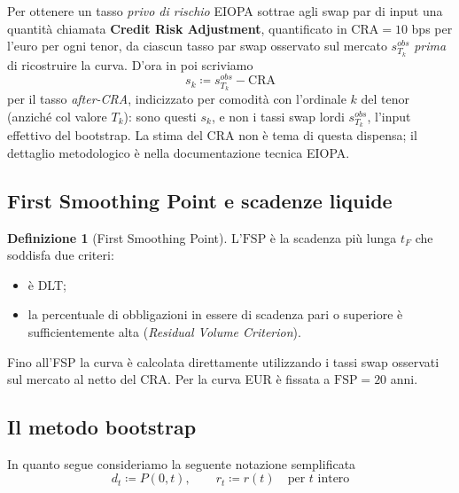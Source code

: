 \documentclass[11pt,a4paper]{article}
\theoremstyle{plain}
\theoremstyle{definition}
\newtheorem{definizione}[teorema]{Definizione}
\theoremstyle{remark}
\newcommand{\FSP}{\mathrm{FSP}}
\newcommand{\CRA}{\mathrm{CRA}}
\newcommand{\defeq}{\coloneqq}
\begin{document}
Per ottenere un tasso \emph{privo di rischio} EIOPA sottrae agli swap par di input una quantità chiamata \textbf{Credit Risk
Adjustment}, quantificato in $\CRA = 10$ bps per l'euro per ogni tenor, da ciascun tasso par swap osservato sul mercato $s^{obs}_{T_k}$
\emph{prima} di ricostruire la curva.
D'ora in poi scriviamo
\begin{equation}
  \label{eq:cra-def}
  s_k \defeq s^{obs}_{T_k} - \CRA
\end{equation}
per il tasso \emph{after-CRA}, indicizzato per comodit\`a con l'ordinale $k$ del tenor
(anzich\'e col valore $T_k$): sono questi $s_k$, e non i tassi swap lordi $s^{obs}_{T_k}$, l'input
effettivo del bootstrap. La stima del $\CRA$ non \`e tema di questa dispensa; il dettaglio
metodologico \`e nella documentazione tecnica EIOPA.

\subsection{First Smoothing Point e scadenze liquide}
\label{sec:fsp-dlt}

\begin{definizione}[First Smoothing Point]
\label{def:fsp}
L'$\FSP$ \`e la scadenza pi\`u lunga $t_F$ che soddisfa due criteri: \begin{itemize} \item  \`e DLT; \item  la
percentuale di obbligazioni in essere di scadenza pari o superiore \`e sufficientemente alta
(\emph{Residual Volume Criterion}). 
\end{itemize}
Fino all'FSP la curva \`e calcolata direttamente utilizzando i tassi swap osservati sul mercato al netto del CRA. 
Per la curva EUR è fissata a $\FSP=20$ anni.
\end{definizione}


\subsection{Il metodo bootstrap}
\label{sec:bootstrap}

In quanto segue consideriamo la seguente notazione semplificata
\[
  d_t \defeq P(0,t), \qquad r_t \defeq r(t) \quad\text{per } t \text{ intero}
\]
\end{document}
